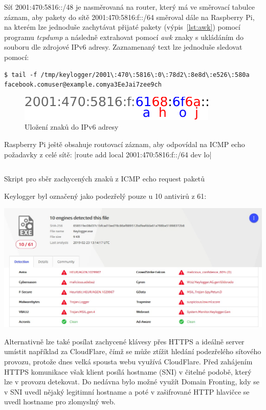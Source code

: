 \documentclass[12pt]{article}
\begin{document}
Síť 2001:470:5816::/48 je nasměrovaná na router, který má ve směrovací tabulce záznam, aby pakety do sítě 2001:470:5816:f::/64 směroval dále na Raspberry Pi, na kterém lze jednoduše zachytávat přijaté pakety (výpis~\ref{lst:awk}) pomocí programu \textit{tcpdump} a následně extrahovat pomocí \textit{awk} znaky s ukládáním do souboru dle zdrojové IPv6 adresy.
Zaznamenaný text lze jednoduše sledovat pomocí:

\begin{verbatim}
$ tail -f /tmp/keylogger/2001\:470\:5816\:0\:78d2\:8e8d\:e526\:580a
facebook.comuser@example.comya3EeJai7zee9ch
\end{verbatim}



\begin{figure}
\centering
\includegraphics{ip.pdf}
\caption{Uložení znaků do IPv6 adresy}
\label{fig:ip}
\end{figure}


Raspberry Pi ještě obsahuje routovací záznam, aby odpovídal na ICMP echo požadavky z celé sítě: |route add local 2001:470:5816:f::/64 dev lo|

\begin{listing}[ht]
\inputminted{bash}{../capture.sh}
\caption{Skript pro sběr zachycených znaků z ICMP echo request paketů}
\label{lst:awk}
\end{listing}

Keylogger byl označený jako podezřelý pouze u 10 antivirů z 61:

\includegraphics[width=\textwidth]{virustotal}

Alternativně lze také posílat zachycené klávesy přes HTTPS a ideálně server umístit například za CloudFlare, čímž se může ztížit hledání podezřelého sítového provozu, protože dnes velká spousta webu využívá CloudFlare.
Před zahájením HTTPS komunikace však klient posílá hostname (SNI) v čitelné podobě, který lze v provozu detekovat.
Do nedávna bylo možné využít Domain Fronting, kdy se v SNI uvedl nějaký legitimní hostname a poté v zašifrované HTTP hlavičce se uvedl hostname pro zlomyslný web.
\end{document}
